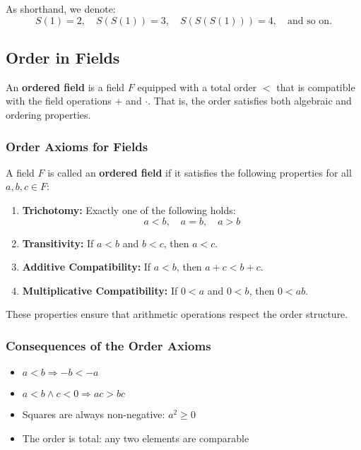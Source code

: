 As shorthand, we denote:
\[
	S(1) = 2, \quad S(S(1)) = 3, \quad S(S(S(1))) = 4, \quad \text{and so on.}
\]

\subsection{Order in Fields}

An \textbf{ordered field} is a field \( F \) equipped with a total order \( < \) that is compatible with the field operations \( + \) and \( \cdot \). That is, the order satisfies both algebraic and ordering properties.

\subsubsection{Order Axioms for Fields}

A field \( F \) is called an \textbf{ordered field} if it satisfies the following properties for all \( a, b, c \in F \):

\begin{enumerate}[label=\Roman*.]
    \item \textbf{Trichotomy:} Exactly one of the following holds:
    \[
    a < b, \quad a = b, \quad a > b
    \]

    \item \textbf{Transitivity:} If \( a < b \) and \( b < c \), then \( a < c \).

    \item \textbf{Additive Compatibility:} If \( a < b \), then \( a + c < b + c \).

    \item \textbf{Multiplicative Compatibility:} If \( 0 < a \) and \( 0 < b \), then \( 0 < ab \).
\end{enumerate}

These properties ensure that arithmetic operations respect the order structure.

\subsubsection{Consequences of the Order Axioms}

\begin{itemize}[label=\(-\)]
    \item \( a < b \Rightarrow -b < -a \)
    \item \( a < b \land c < 0 \Rightarrow ac > bc \)
    \item Squares are always non-negative: \( a^2 \ge 0 \)
    \item The order is total: any two elements are comparable
\end{itemize}

